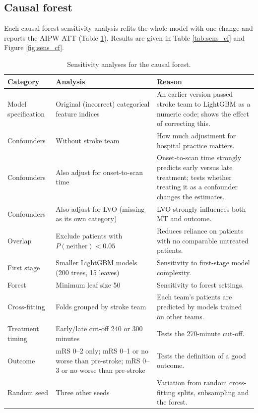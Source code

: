 \subsection{Causal forest}\label{sec:sens_cf}

Each causal forest sensitivity analysis refits the whole model with one change and reports the AIPW ATT (Table \ref{tab:sens_analyses_cf}). Results are given in Table \ref{tab:sens_cf} and Figure \ref{fig:sens_cf}.

\begin{table}[htbp]
\centering
\footnotesize
\caption{Sensitivity analyses for the causal forest.}
\label{tab:sens_analyses_cf}
\begin{tabular}{@{}p{}p{}p{}@{}}
\toprule
Category & Analysis & Reason \\
\midrule
Model specification & Original (incorrect) categorical feature indices & An earlier version passed stroke team to LightGBM as a numeric code; shows the effect of correcting this. \\
Confounders & Without stroke team & How much adjustment for hospital practice matters. \\
Confounders & Also adjust for onset-to-scan time & Onset-to-scan time strongly predicts early versus late treatment; tests whether treating it as a confounder changes the estimates. \\
Confounders & Also adjust for LVO (missing as its own category) & LVO strongly influences both MT and outcome. \\
Overlap & Exclude patients with $P(\mathrm{neither}) < 0.05$ & Reduces reliance on patients with no comparable untreated patients. \\
First stage & Smaller LightGBM models (200 trees, 15 leaves) & Sensitivity to first-stage model complexity. \\
Forest & Minimum leaf size 50 & Sensitivity to forest settings. \\
Cross-fitting & Folds grouped by stroke team & Each team's patients are predicted by models trained on other teams. \\
Treatment timing & Early/late cut-off 240 or 300 minutes & Tests the 270-minute cut-off. \\
Outcome & mRS 0--2 only; mRS 0--1 or no worse than pre-stroke; mRS 0--3 or no worse than pre-stroke & Tests the definition of a good outcome. \\
Random seed & Three other seeds & Variation from random cross-fitting splits, subsampling and the forest. \\
\bottomrule
\end{tabular}
\end{table}

